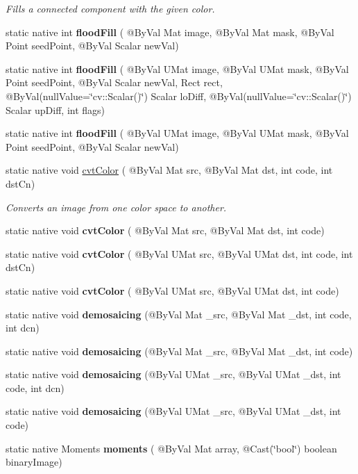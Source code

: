\begin{DoxyCompactItemize}
\begin{DoxyCompactList}\small\item\em Fills a connected component with the given color. \end{DoxyCompactList}\item 
static native int {\bfseries flood\+Fill} ( @By\+Val Mat image, @By\+Val Mat mask, @By\+Val Point seed\+Point, @By\+Val Scalar new\+Val)
\item 
static native int {\bfseries flood\+Fill} ( @By\+Val U\+Mat image, @By\+Val U\+Mat mask, @By\+Val Point seed\+Point, @By\+Val Scalar new\+Val, Rect rect, @By\+Val(null\+Value=\char`\"{}cv\+::\+Scalar()\char`\"{}) Scalar lo\+Diff, @By\+Val(null\+Value=\char`\"{}cv\+::\+Scalar()\char`\"{}) Scalar up\+Diff, int flags)
\item 
static native int {\bfseries flood\+Fill} ( @By\+Val U\+Mat image, @By\+Val U\+Mat mask, @By\+Val Point seed\+Point, @By\+Val Scalar new\+Val)
\item 
static native void \hyperlink{group__imgproc__misc_gaab99985581c43cce9df680e6586cb9ef}{cvt\+Color} ( @By\+Val Mat src, @By\+Val Mat dst, int code, int dst\+Cn)
\begin{DoxyCompactList}\small\item\em Converts an image from one color space to another. \end{DoxyCompactList}\item 
static native void {\bfseries cvt\+Color} ( @By\+Val Mat src, @By\+Val Mat dst, int code)
\item 
static native void {\bfseries cvt\+Color} ( @By\+Val U\+Mat src, @By\+Val U\+Mat dst, int code, int dst\+Cn)
\item 
static native void {\bfseries cvt\+Color} ( @By\+Val U\+Mat src, @By\+Val U\+Mat dst, int code)
\item 
static native void {\bfseries demosaicing} (@By\+Val Mat \+\_\+src, @By\+Val Mat \+\_\+dst, int code, int dcn)
\item 
static native void {\bfseries demosaicing} (@By\+Val Mat \+\_\+src, @By\+Val Mat \+\_\+dst, int code)
\item 
static native void {\bfseries demosaicing} (@By\+Val U\+Mat \+\_\+src, @By\+Val U\+Mat \+\_\+dst, int code, int dcn)
\item 
static native void {\bfseries demosaicing} (@By\+Val U\+Mat \+\_\+src, @By\+Val U\+Mat \+\_\+dst, int code)
\item 
static native Moments {\bfseries moments} ( @By\+Val Mat array, @Cast(\char`\"{}bool\char`\"{}) boolean binary\+Image)

\end{DoxyCompactItemize}
